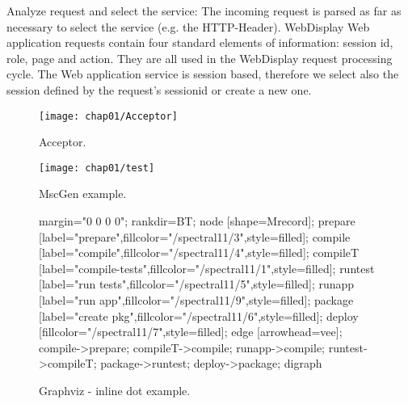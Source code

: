 Analyze request and select the service:
The incoming request is parsed as far as necessary to select the service (e.g.
the HTTP-Header). WebDisplay Web application requests contain four standard
elements of information: session id, role, page and action. They are all used in
the WebDisplay request processing cycle. The Web application service is session
based, therefore we select also the session defined by the request’s sessionid
or create a new one.

\begin{figure}[hbt]
  \centering
  \texttt{[image: chap01/Acceptor]}
  \caption{Acceptor.}
  \label{fig:acceptor}
\end{figure}

\begin{figure}[hbt]
  \centering
  \texttt{[image: chap01/test]}
  \caption{MscGen example.}
  \label{fig:mscgen_example}
\end{figure}

\begin{figure}[hbt]
  \centering
    {
      margin="0 0 0 0";
      rankdir=BT;
      node [shape=Mrecord];
      prepare [label="prepare",fillcolor="/spectral11/3",style=filled];
      compile [label="compile",fillcolor="/spectral11/4",style=filled];
      compileT [label="compile-tests",fillcolor="/spectral11/1",style=filled];
      runtest [label="run tests",fillcolor="/spectral11/5",style=filled];
      runapp [label="run app",fillcolor="/spectral11/9",style=filled];
      package [label="create pkg",fillcolor="/spectral11/6",style=filled];
      deploy [fillcolor="/spectral11/7",style=filled];
      edge [arrowhead=vee];
      compile->prepare;
      compileT->compile;
      runapp->compile;
      runtest->compileT;
      package->runtest;
      deploy->package;
    }{digraph}
  \caption{Graphviz - inline dot example.}
  \label{fig:graphviz_inline_sample}
\end{figure}

